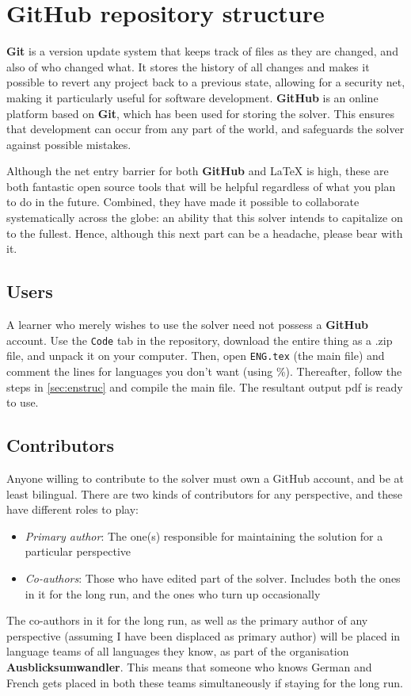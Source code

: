 \documentclass[12pt,twoside]{article}
\newcommand*{\bt}[1]{\textbf{#1}}
\begin{document}
\section{GitHub repository structure}
\bt{Git} is a version update system that keeps track of files as they are changed, and also of who changed what. It stores the history of all changes and makes it possible to revert any project back to a previous state, allowing for a security net, making it particularly useful for software development. \bt{GitHub} is an online platform based on \bt{Git}, which has been used for storing the solver. This ensures that development can occur from any part of the world, and safeguards the solver against possible mistakes.

Although the net entry barrier for both \bt{GitHub} and \LaTeX{} is high, these are both fantastic open source tools that will be helpful regardless  of what you plan to do in the future. Combined, they have made it possible to  collaborate systematically across the globe: an ability that this solver intends to capitalize on to the fullest. Hence, although this next part can be a headache, please bear with it.
\subsection{Users}
A learner who merely wishes to use the solver need not possess a \bt{GitHub} account. Use the \texttt{Code} tab in the repository,  download the entire thing as a .zip file, and unpack it on your computer. Then, open \texttt{ENG.tex} (the main file) and comment the \verb|| lines for languages you don't want (using \%). Thereafter, follow the steps in \autoref{sec:enstruc} and compile the main file. The resultant output pdf is ready to use.
\subsection{Contributors}
Anyone willing to contribute to the solver must own a GitHub account, and be at least bilingual. There are two kinds of contributors for any perspective, and these have different roles to play:
\begin{itemize}
    \item \textit{Primary author}: The one(s) responsible for maintaining the solution for a particular perspective
    \item \textit{Co-authors}: Those who have edited part of the solver. Includes both the ones in it for the long run, and the ones who turn up occasionally
\end{itemize}
The co-authors in it for the long run, as well as the primary author of any perspective (assuming I have been displaced as primary author) will be placed in language teams of all languages they know, as part of the organisation \bt{Ausblicksumwandler}. This means that someone who knows German and French gets placed in both these teams simultaneously if staying for the long run.
\end{document}

